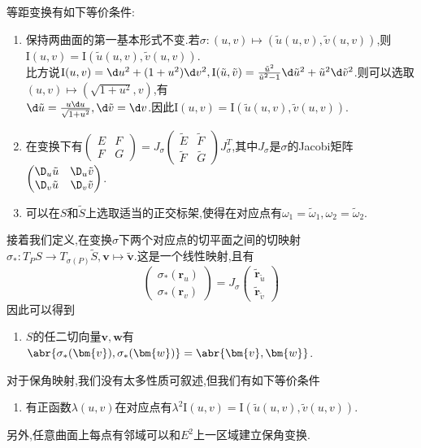 \documentclass{article}
\begin{document}
等距变换有如下等价条件:\begin{enumerate}
    \item 保持两曲面的第一基本形式不变.若$\sigma:(u,v)\mapsto(\tilde{u}(u,v),\tilde{v}(u,v))$,则$\mathrm{I}(u,v)=\mathrm{I}(\tilde{u}(u,v),\tilde{v}(u,v))$.\\
    比方说$\mathrm{I}(u,v)=\d u^2+(1+u^2)\d v^2,\mathrm{I}(\tilde{u},\tilde{v})=\frac{\tilde{u}^2}{\tilde{u}^2-1}\d \tilde{u}^2+\tilde{u}^2\d\tilde{v}^2$.则可以选取$(u,v)\mapsto(\sqrt{1+u^2},v)$,有\\$\d \tilde{u}=\frac{u\d u}{\sqrt{1+u^2}},\d \tilde{v}=\d v$.因此$\mathrm{I}(u,v)=\mathrm{I}(\tilde{u}(u,v),\tilde{v}(u,v))$.
    \item 在变换下有$\begin{pmatrix}E&F\\F&G\end{pmatrix}=J_\sigma\begin{pmatrix}\tilde{E}&\tilde{F}\\\tilde{F}&\tilde{G}\end{pmatrix}J_\sigma^T$,其中$J_\sigma$是$\sigma$的Jacobi矩阵$\begin{pmatrix}
        \D_u\tilde{u}&\D_u\tilde{v}\\\D_v\tilde{u}&\D_v\tilde{v}
    \end{pmatrix}$.
    \item 可以在$S$和$\tilde{S}$上选取适当的正交标架,使得在对应点有$\omega_1=\tilde{\omega}_1,\omega_2=\tilde{\omega}_2$.
\end{enumerate}
接着我们定义,在变换$\sigma$下两个对应点的切平面之间的切映射$\sigma_*:T_PS\to T_{\sigma(P)}\tilde{S},\bm{v}\mapsto \tilde{\bm{v}}$.这是一个线性映射,且有
$$\begin{pmatrix}
    \sigma_*(\bm{r}_u)\\\sigma_*(\bm{r}_v)
\end{pmatrix}=J_\sigma\begin{pmatrix}
    \tilde{\bm{r}}_{\tilde{u}}\\\tilde{\bm{r}}_{\tilde{v}}
\end{pmatrix}$$
因此可以得到\begin{enumerate}[resume]
    \item $S$的任二切向量$\bm{v},\bm{w}$有$\abr{\sigma_*(\bm{v}),\sigma_*(\bm{w})}=\abr{\bm{v},\bm{w}}$.
\end{enumerate}

对于保角映射,我们没有太多性质可叙述,但我们有如下等价条件
\begin{enumerate}
    \item 有正函数$\lambda(u,v)$在对应点有$\lambda^2\mathrm{I}(u,v)=\mathrm{I}(\tilde{u}(u,v),\tilde{v}(u,v))$.
\end{enumerate}
另外,任意曲面上每点有邻域可以和$E^2$上一区域建立保角变换.
\end{document}
